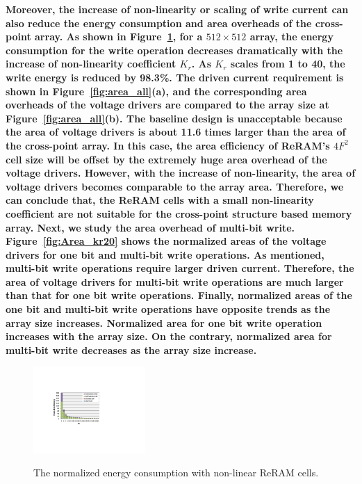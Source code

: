 \textbf{Moreover, the increase of non-linearity or scaling of write
current can also reduce the energy consumption and area overheads of the
cross-point array. As shown in Figure~\ref{fig:non_linear_energy}, for a
$512 \times 512$ array, the energy consumption for the write operation
decreases dramatically with the increase of non-linearity coefficient
$K_r$. As $K_r$ scales from 1 to 40, the write energy is reduced by
98.3\%. The driven current requirement is shown in
Figure~\ref{fig:area_all}(a), and the corresponding area overheads of the
voltage drivers are compared to the array size at
Figure~\ref{fig:area_all}(b). The baseline design is unacceptable because
the area of voltage drivers is about 11.6 times larger than the area of
the cross-point array. In this case, the area efficiency of ReRAM's $4F^2$
cell size will be offset by the extremely huge area overhead of the
voltage drivers. However, with the increase of non-linearity, the area of
voltage drivers becomes comparable to the array area. Therefore, we can
conclude that, the ReRAM cells with a small non-linearity coefficient are
not suitable for the cross-point structure based memory array. Next, we
study the area overhead of multi-bit write. Figure~\ref{fig:Area_kr20}
shows the normalized areas of the voltage drivers for one bit and
multi-bit write operations. As mentioned, multi-bit write operations
require larger driven current. Therefore, the area of voltage drivers for
multi-bit write operations are much larger than that for one bit write
operations. Finally, normalized areas of the one bit and multi-bit write
operations have opposite trends as the array size increases. Normalized
area for one bit write operation increases with the array size. On the
contrary, normalized area for multi-bit write decreases as the array size
increase.}

\begin{figure}%
\centering
  \includegraphics[width=0.38\textwidth]{./figures/non_linear_energy.pdf}\\
  \caption{The normalized energy consumption with non-linear ReRAM cells.}\label{fig:non_linear_energy}
\end{figure}


